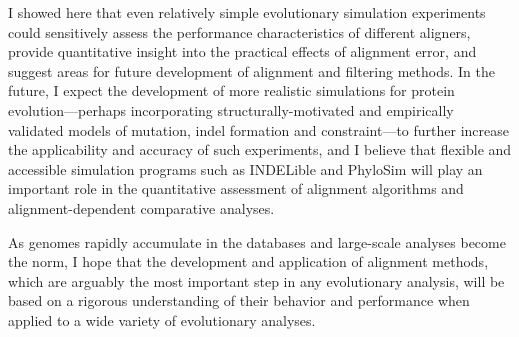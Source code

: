 I showed here that even relatively simple evolutionary simulation
experiments could sensitively assess the performance characteristics
of different aligners, provide quantitative insight into the practical
effects of alignment error, and suggest areas for future development
of alignment and filtering methods. In the future, I expect the
development of more realistic simulations for protein
evolution---perhaps incorporating structurally-motivated and
empirically validated models of mutation, indel formation and
constraint---to further increase the applicability and accuracy of
such experiments, and I believe that flexible and accessible
simulation programs such as INDELible \citep{Fletcher2009INDELible}
and PhyloSim \citep{Sipos2011PhyloSim} will play an important role in
the quantitative assessment of alignment algorithms and
alignment-dependent comparative analyses.

As genomes rapidly accumulate in the databases and large-scale
analyses become the norm, I hope that the development and application
of alignment methods, which are arguably the most important step in
any evolutionary analysis, will be based on a rigorous understanding
of their behavior and performance when applied to a wide variety of
evolutionary analyses.
